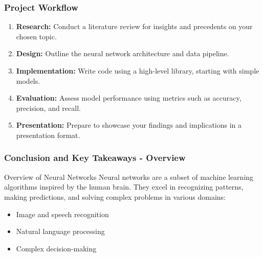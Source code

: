 \documentclass[aspectratio=169]{beamer}
\begin{document}
\begin{frame}[fragile]
    \frametitle{Project Workflow}
    \begin{enumerate}
        \item \textbf{Research:} Conduct a literature review for insights and precedents on your chosen topic.
        \item \textbf{Design:} Outline the neural network architecture and data pipeline.
        \item \textbf{Implementation:} Write code using a high-level library, starting with simple models.
        \item \textbf{Evaluation:} Assess model performance using metrics such as accuracy, precision, and recall.
        \item \textbf{Presentation:} Prepare to showcase your findings and implications in a presentation format.
    \end{enumerate}
\end{frame}

\begin{frame}[fragile]
    \frametitle{Conclusion and Key Takeaways - Overview}
    \begin{block}{Overview of Neural Networks}
        Neural networks are a subset of machine learning algorithms inspired by the human brain. They excel in recognizing patterns, making predictions, and solving complex problems in various domains:
        \begin{itemize}
            \item Image and speech recognition
            \item Natural language processing
            \item Complex decision-making
        \end{itemize}
    \end{block}
\end{frame}
\end{document}
